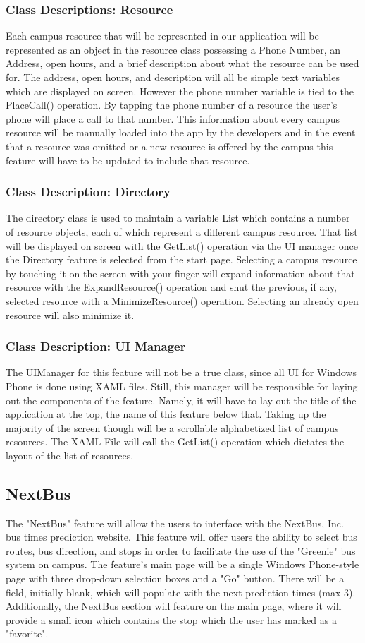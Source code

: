 \documentclass[pdftex,12pt,letter]{article}
\begin{document}
\subsubsection{Class Descriptions: Resource}
Each campus resource that will be represented in our application will be represented as an object in the resource class possessing a Phone Number, an Address, open hours, and a brief description about what the resource can be used for. The address, open hours, and description will all be simple text variables which are displayed on screen. However the phone number variable is tied to the PlaceCall() operation. By tapping the phone number of a resource the user’s phone will place a call to that number. This information about every campus resource will be manually loaded into the app by the developers and in the event that a resource was omitted or a new resource is offered by the campus this feature will have to be updated to include that resource. 
\subsubsection{Class Description: Directory}
The directory class is used to maintain a variable List which contains a number of resource objects, each of which represent a different campus resource. That list will be displayed on screen with the GetList() operation via the UI manager once the Directory feature is selected from the start page. Selecting a campus resource by touching it on the screen with your finger will expand information about that resource with the ExpandResource() operation and shut the previous, if any, selected resource with a MinimizeResource() operation. Selecting an already open resource will also minimize it.
\subsubsection{Class Description: UI Manager}
The UIManager for this feature will not be a true class, since all UI for Windows Phone is done using XAML files. Still, this manager will be responsible for laying out the components of the feature. Namely, it will have to lay out the title of the application at the top, the name of this feature below that. Taking up the majority of the screen though will be a scrollable alphabetized list of campus resources. The XAML File will call the GetList() operation which dictates the layout of the list of resources.


\subsection{NextBus}
The "NextBus" feature will allow the users to interface with the NextBus, Inc. bus times prediction website. This feature will offer users the ability to select bus routes, bus direction, and stops in order to facilitate the use of the "Greenie" bus system on campus. The feature's main page will be a single Windows Phone-style page with three drop-down selection boxes and a "Go" button. There will be a field, initially blank, which will populate with the next prediction times (max 3). Additionally, the NextBus section will feature on the main page, where it will provide a small icon which contains the stop which the user has marked as a "favorite".
\end{document}

